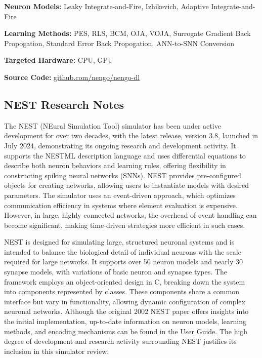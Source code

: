\begin{tcolorbox}[enhanced,attach boxed title to top center={yshift=-3mm,yshifttext=-1mm}, colback=blue!5!white,colframe=blue!75!black,colbacktitle=red!80!black, title=NengoDL at a Glance,fonttitle=\bfseries, boxed title style={size=small,colframe=red!50!black} ]

\textbf{Neuron Models:} Leaky Integrate-and-Fire, Izhikevich, Adaptive Integrate-and-Fire

\textbf{Learning Methods:} PES, RLS, BCM, OJA, VOJA, Surrogate Gradient Back Propogation, Standard Error Back Propogation, ANN-to-SNN Conversion  

\textbf{Targeted Hardware:} CPU, GPU 

\textbf{Source Code:} \href{https://github.com/nengo/nengo-dl}{github.com/nengo/nengo-dl}
\end{tcolorbox}
\subsection*{NEST Research Notes}\label{NEST}

The NEST (NEural Simulation Tool) simulator has been under active development for over two decades, with the latest release, version 3.8, launched in July 2024, demonstrating its ongoing research and development activity. It supports the NESTML description language and uses differential equations to describe both neuron behaviors and learning rules, offering flexibility in constructing spiking neural networks (SNNs). NEST provides pre-configured objects for creating networks, allowing users to instantiate models with desired parameters. The simulator uses an event-driven approach, which optimizes communication efficiency in systems where element evaluation is expensive. However, in large, highly connected networks, the overhead of event handling can become significant, making time-driven strategies more efficient in such cases.

NEST is designed for simulating large, structured neuronal systems and is intended to balance the biological detail of individual neurons with the scale required for large networks. It supports over 50 neuron models and nearly 30 synapse models, with variations of basic neuron and synapse types. The framework employs an object-oriented design in C, breaking down the system into components represented by classes. These components share a common interface but vary in functionality, allowing dynamic configuration of complex neuronal networks. Although the original 2002 NEST paper offers insights into the initial implementation, up-to-date information on neuron models, learning methods, and encoding mechanisms can be found in the User Guide. The high degree of development and research activity surrounding NEST justifies its inclusion in this simulator review.

